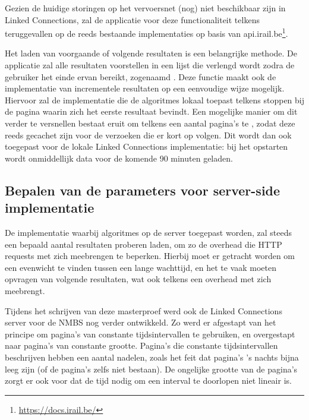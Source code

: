 Gezien de huidige storingen op het vervoersnet (nog) niet beschikbaar zijn in Linked Connections, zal de applicatie voor deze functionaliteit telkens teruggevallen op de reeds bestaande implementaties op basis van api.irail.be\footnote{\url{https://docs.irail.be/}}.

Het laden van voorgaande of volgende resultaten is een belangrijke methode. De applicatie zal alle resultaten voorstellen in een lijst die verlengd wordt zodra de gebruiker het einde ervan bereikt, zogenaamd . Deze functie maakt ook de implementatie van incrementele resultaten op een eenvoudige wijze mogelijk. Hiervoor zal de implementatie die de algoritmes lokaal toepast telkens stoppen bij de pagina waarin zich het eerste resultaat bevindt. Een mogelijke manier om dit verder te versnellen bestaat eruit om telkens een aantal pagina's te , zodat deze reeds gecachet zijn voor de verzoeken die er kort op volgen. Dit wordt dan ook toegepast voor de lokale Linked Connections implementatie: bij het opstarten wordt onmiddellijk data voor de komende 90 minuten geladen.

\subsection{Bepalen van de parameters voor server-side implementatie}

De implementatie waarbij algoritmes op de server toegepast worden, zal steeds een bepaald aantal resultaten proberen laden, om zo de overhead die HTTP requests met zich meebrengen te beperken. Hierbij moet er getracht worden om een evenwicht te vinden tussen een lange wachttijd, en het te vaak moeten opvragen van volgende resultaten, wat ook telkens een overhead met zich meebrengt.

Tijdens het schrijven van deze masterproef werd ook de Linked Connections server voor de NMBS nog verder ontwikkeld. Zo werd er afgestapt van het principe om pagina's van constante tijdsintervallen te gebruiken, en overgestapt naar pagina's van constante grootte. Pagina's die constante tijdsintervallen beschrijven hebben een aantal nadelen, zoals het feit dat pagina's 's nachts bijna leeg zijn (of de pagina's zelfs niet bestaan). De ongelijke grootte van de pagina's zorgt er ook voor dat de tijd nodig om een interval te doorlopen niet lineair is. 

